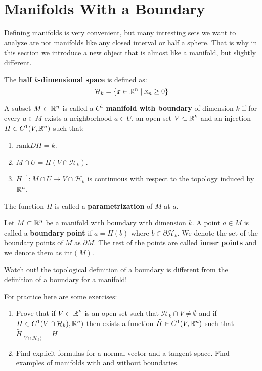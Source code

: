 \documentclass[11pt,a4paper]{article}
\begin{document}
	\section{Manifolds With a Boundary}
	Defining manifolds is very convenient, but many intresting sets
	we want to analyze are not manifolds like any closed interval or
	half a sphere. That is why in this section we introduce a new object
	that is almost like a manifold, but slightly different.
	\begin{definition}
		The \textbf{half $k$-dimensional space} is defined as:
		\[
			\mathcal{H}_k = \{x \in \mathbb{R}^n \mid x_n \geq 0\}
		\]
	\end{definition}
	\begin{definition}
		A subset $M \subset \mathbb{R}^n$ is called a $C^1$ \textbf{manifold 
		with boundary} of dimension $k$ if for every $a \in M$ exists
		a neighborhood $a \in U$, an open set $V \subset \mathbb{R}^k$ and
		an injection $H \in C^1(V, \mathbb{R}^n)$ such that:
		\begin{enumerate}
			\item $\mathrm{rank}DH = k$.
			\item $M \cap U = H(V \cap \mathcal{H}_k)$.
			\item $H^{-1} \colon M \cap U \to V \cap \mathcal{H}_k$
			is continuous with respect to the topology induced by $\mathbb{R}^n$.
		\end{enumerate}
		The function $H$ is called a \textbf{parametrization} of $M$ at
		$a$.
	\end{definition}
	\begin{definition}
		Let $M \subset \mathbb{R}^n$ be a manifold with boundary with dimension
		$k$. A point $a \in M$ is called a \textbf{boundary point}
		if $a = H(b)$ where $b \in \partial \mathcal{H}_k$. We denote
		the set of the boundary points of $M$ as $\partial M$. The
		rest of the points are called \textbf{inner points} and we denote
		them as $\mathrm{int}(M)$.
	\end{definition}
	\begin{remark}
		\underline{Watch out!} the topological definition of a boundary
		is different from the definition of a boundary for a manifold!
	\end{remark}
	For practice here are some exercises:
	\begin{enumerate}
		\item Prove that if $V \subset \mathbb{R}^k$ is an open set such that
		$\mathcal{H}_k \cap V \neq \emptyset$ and if 
		$H \in C^1(V \cap \mathcal{H}_k), \mathbb{R}^n)$ then exists a function
		$\tilde{H} \in C^1(V, \mathbb{R}^n)$ such that 
		$\tilde{H}\vert_{V \cap \mathcal{H}_k)} = H$
		\item Find explicit formulas for a normal vector and a tangent
		space. Find examples of manifolds with and without boundaries.
	\end{enumerate}
	
\end{document}
